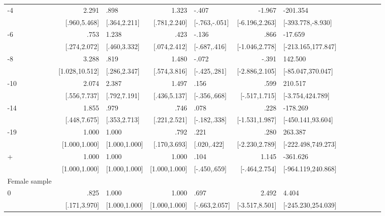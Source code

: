 \begin{table}[h]
\begin{adjustbox}{max width=\linewidth}
\begin{threeparttable}
{\begin{tabular}{l*{6}{D{.}{.}{-1}l}}
-4             &           2.291&            .898&           1.323&           -.407&          -1.967&        -201.354\\
                &    [.960,5.468]&    [.364,2.211]&    [.781,2.240]&   [-.763,-.051]&  [-6.196,2.263]&[-393.778,-8.930]\\
-6             &            .753&           1.238&            .423&           -.136&            .866&         -17.659\\
                &    [.274,2.072]&    [.460,3.332]&    [.074,2.412]&    [-.687,.416]&  [-1.046,2.778]&[-213.165,177.847]\\
-8             &           3.288&            .819&           1.480&           -.072&           -.391&         142.500\\
                &  [1.028,10.512]&    [.286,2.347]&    [.574,3.816]&    [-.425,.281]&  [-2.886,2.105]&[-85.047,370.047]\\
-10            &           2.074&           2.387&           1.497&            .156&            .599&         210.517\\
                &    [.556,7.737]&    [.792,7.191]&    [.436,5.137]&    [-.356,.668]&   [-.517,1.715]&[-3.754,424.789]\\
-14           &           1.855&            .979&            .746&            .078&            .228&        -178.269\\
                &    [.448,7.675]&    [.353,2.713]&    [.221,2.521]&    [-.182,.338]&  [-1.531,1.987]&[-450.141,93.604]\\
-19           &           1.000&           1.000&            .792&            .221&            .280&         263.387\\
                &   [1.000,1.000]&   [1.000,1.000]&    [.170,3.693]&     [.020,.422]&  [-2.230,2.789]&[-222.498,749.273]\\
+             &           1.000&           1.000&           1.000&            .104&           1.145&        -361.626\\
                &   [1.000,1.000]&   [1.000,1.000]&   [1.000,1.000]&    [-.450,.659]&   [-.464,2.754]&[-964.119,240.868]\\
\midrule
Female sample &&&&&&\\
0               &            .825&           1.000&           1.000&            .697&           2.492&           4.404\\
                &    [.171,3.970]&   [1.000,1.000]&   [1.000,1.000]&   [-.663,2.057]&  [-3.517,8.501]&[-245.230,254.039]\\

\end{tabular}}
\end{threeparttable}
\end{adjustbox}
\end{table}
